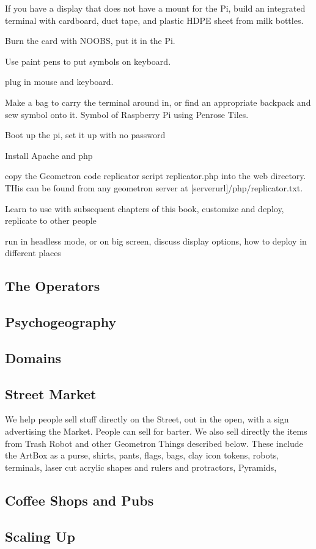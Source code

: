 If you have a display that does not have a mount for the Pi, build an integrated terminal with cardboard, duct tape, and plastic HDPE sheet from milk bottles.

Burn the card with NOOBS, put it in the Pi.

Use paint pens to put symbols on keyboard.

plug in mouse and keyboard.

Make a bag to carry the terminal around in, or find an appropriate backpack and sew symbol onto it.  Symbol of Raspberry Pi using Penrose Tiles.

Boot up the pi, set it up with no password

Install Apache and php

copy the Geometron code replicator script replicator.php into the web directory. THis can be found from any geometron server at [serverurl]/php/replicator.txt.  

Learn to use with subsequent chapters of this book, customize and deploy, replicate to other people

run in headless mode, or on big screen, discuss display options, how to deploy in different places

\subsection{The Operators}
\subsection{Psychogeography}
\subsection{Domains}
\subsection{Street Market}
We help people sell stuff directly on the Street, out in the open, with a sign advertising the Market.  People can sell for barter.  We also sell directly the items from Trash Robot and other Geometron Things described below.  These include the ArtBox as a purse, shirts, pants, flags, bags, clay icon tokens, robots, terminals, laser cut acrylic shapes and rulers and protractors, Pyramids,
\subsection{Coffee Shops and Pubs}
\subsection{Scaling Up}


